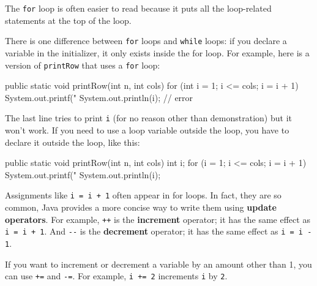 \documentclass[12pt]{book}
\theoremstyle{exercise}
\newcommand{\java}[1]{\verb"#1"}
\newcommand{\java}[1]{\lstinline{#1}} %
\begin{document}
The \java{for} loop is often easier to read because it puts all the loop-related statements at the top of the loop.

There is one difference between \java{for} loops and \java{while} loops: if you declare a variable in the initializer, it only exists inside the for loop.
For example, here is a version of \java{printRow} that uses a \java{for} loop:

\begin{code}
    public static void printRow(int n, int cols) {
        for (int i = 1; i <= cols; i = i + 1) {
            System.out.printf("%
        }
        System.out.println(i);   // error
    }
\end{code}

The last line tries to print \java{i} (for no reason other than demonstration) but it won't work.
If you need to use a loop variable outside the loop, you have to declare it outside the loop, like this:

\begin{code}
    public static void printRow(int n, int cols) {
        int i;
        for (i = 1; i <= cols; i = i + 1) {
            System.out.printf("%
        }
        System.out.println(i);
    }
\end{code}



Assignments like \java{i = i + 1} often appear in for loops.
In fact, they are so common, Java provides a more concise way to write them using {\bf update operators}.
For example, \java{++} is the {\bf increment} operator; it has the same effect as \java{i = i + 1}.
And \java{--} is the {\bf decrement} operator; it has the same effect as \java{i = i - 1}.

If you want to increment or decrement a variable by an amount other than 1, you can use \java{+=} and \java{-=}.
For example, \java{i += 2} increments \java{i} by \java{2}.





\end{document}
